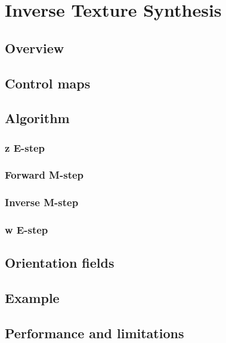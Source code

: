 \section{Inverse Texture Synthesis}
\subsection{Overview}
\subsection{Control maps}
\subsection{Algorithm}
\subsubsection{z E-step}
\subsubsection{Forward M-step}
\subsubsection{Inverse M-step}
\subsubsection{w E-step}
\subsection{Orientation fields}
\subsection{Example}
\subsection{Performance and limitations}